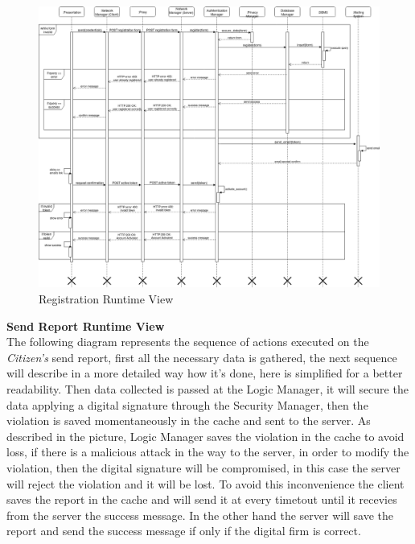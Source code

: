 \documentclass{article}
\begin{document}
\begin{figure}[H]
    \centering
    \includegraphics[scale=0.3]{img/sequence_diagrams/registration_sequence.png}
    \caption{Registration Runtime View}
\end{figure}  
\clearpage
\textbf{Send Report Runtime View}\\
The following diagram represents the sequence of actions executed on the \textit{Citizen's} send report, 
first all the necessary data is gathered, the next sequence will describe in a more detailed way how it's 
done, here is simplified for a better readability. Then data collected is passed at the Logic Manager, 
it will secure the data applying a digital signature through the Security Manager, then the violation is 
saved momentaneously in the cache and sent to the server. As described in the picture, Logic Manager 
saves the violation in the cache to avoid loss, if there is a malicious attack in the way to the server, 
in order to modify the violation, then the digital signature will be compromised, in this case the server 
will reject the violation and it will be lost. To avoid this inconvenience the client saves the report 
in the cache and will send it at every timetout until it recevies from the server the success message. 
In the other hand the server will save the report and send the success message if only if the digital 
firm is correct. 
\end{document}
